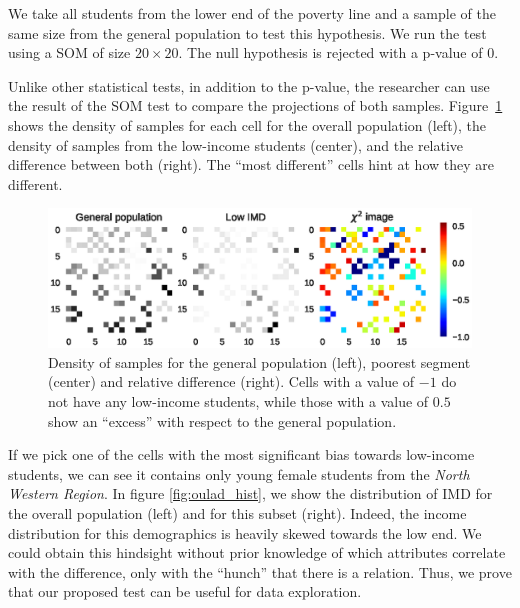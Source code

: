 We take all students from the lower end of the poverty line and a sample of the same size
from the general population to test this hypothesis. We run the test using a \gls{SOM}  of size
$20\times20$. The null hypothesis is rejected with a p-value of $0$.

Unlike other statistical tests, in addition to the p-value, the researcher can use
the result of the \gls{SOM}  test to compare the projections of both samples.
Figure~\ref{fig:oulad_grid} shows the density of samples for each cell for the overall population
(left), the density of samples from the low-income students (center), and the relative difference
between both (right). The ``most different'' cells hint at how they are different.

\begin{figure}[t]
    \centering
    \includegraphics[width=\textwidth]{images/6_som/imd.eps}
    \caption[Comparing \gls{SOM} density variations]{Density of samples for the general population (left), poorest segment (center) and
    relative difference (right). Cells with a value of $-1$ do not have any low-income students,
    while those with a value of $0.5$ show an ``excess'' with respect to the general
    population.}
    \label{fig:oulad_grid}
\end{figure}

If we pick one of the cells with the most significant bias towards low-income students,
we can see it contains only young female students from the \emph{North Western Region}.
In figure \ref{fig:oulad_hist}, we show the distribution of \gls{IMD} for the overall population (left)
and for this subset (right). Indeed, the income distribution for this demographics is
heavily skewed towards the low end. We could obtain this hindsight without prior knowledge of which
attributes correlate with the difference, only with the ``hunch'' that
there is a relation. Thus, we prove that our proposed test can be useful for data exploration.

